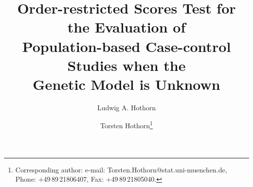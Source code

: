\documentclass[bimj,fleqn]{w-art}
\begin{document}
\newcommand{\url}[1]{\texttt{#1}}




\title[Order-restricted Scores Test]{Order-restricted Scores Test for the Evaluation of \\
       Population-based Case-control Studies when the \\
       Genetic Model is Unknown}

\author[Ludwig A. Hothorn]{Ludwig A. Hothorn }
\address[\inst{1}]{Institut f\"ur Biostatistik, Leibniz Universit\"at Hannover \\
Herrenh\"auser Stra{\ss}e 2, D--30419 Hannover, Germany}

\author[Torsten Hothorn]{Torsten Hothorn\footnote{Corresponding
     author: e-mail: {\sf Torsten.Hothorn@stat.uni-muenchen.de}, Phone: +49\,89\,21806407,
     Fax: +49\,89\,21805040.} } 
\address[\inst{2}]{
Institut f{\"u}r Statistik \\ Ludwig-Maximilians-Universit{\"a}t M{\"u}nchen \\
Ludwigstra{\ss }e 33, D--80539 M{\"u}nchen, Germany}
\end{document}
